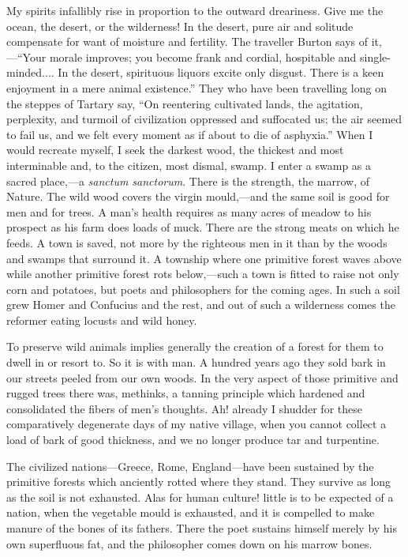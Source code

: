 \documentclass[twoside,openright,10pt]{memoir} %
\begin{document}
My spirits infallibly rise in proportion to the outward dreariness. Give me the ocean, the desert, or the wilderness! In the desert, pure air and solitude compensate for want of moisture and fertility. The traveller Burton says of it,—“Your morale improves; you become frank and cordial, hospitable and single-minded.... In the desert, spirituous liquors excite only disgust. There is a keen enjoyment in a mere animal existence.” They who have been travelling long on the steppes of Tartary say, “On reentering cultivated lands, the agitation, perplexity, and turmoil of civilization oppressed and suffocated us; the air seemed to fail us, and we felt every moment as if about to die of asphyxia.” When I would recreate myself, I seek the darkest wood, the thickest and most interminable and, to the citizen, most dismal, swamp. I enter a swamp as a sacred place,—a \emph{sanctum sanctorum}. There is the strength, the marrow, of Nature. The wild wood covers the virgin mould,—and the same soil is good for men and for trees. A man’s health requires as many acres of meadow to his prospect as his farm does loads of muck. There are the strong meats on which he feeds. A town is saved, not more by the righteous men in it than by the woods and swamps that surround it. A township where one primitive forest waves above while another primitive forest rots below,—such a town is fitted to raise not only corn and potatoes, but poets and philosophers for the coming ages. In such a soil grew Homer and Confucius and the rest, and out of such a wilderness comes the reformer eating locusts and wild honey.

To preserve wild animals implies generally the creation of a forest for them to dwell in or resort to. So it is with man. A hundred years ago they sold bark in our streets peeled from our own woods. In the very aspect of those primitive and rugged trees there was, methinks, a tanning principle which hardened and consolidated the fibers of men’s thoughts. Ah! already I shudder for these comparatively degenerate days of my native village, when you cannot collect a load of bark of good thickness, and we no longer produce tar and turpentine.

The civilized nations—Greece, Rome, England—have been sustained by the primitive forests which anciently rotted where they stand. They survive as long as the soil is not exhausted. Alas for human culture! little is to be expected of a nation, when the vegetable mould is exhausted, and it is compelled to make manure of the bones of its fathers. There the poet sustains himself merely by his own superfluous fat, and the philosopher comes down on his marrow bones.
\end{document}
